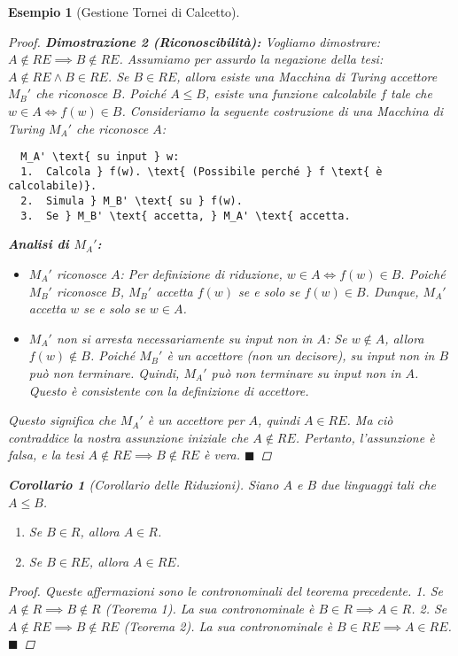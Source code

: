 \documentclass[a4paper]{article}
\newtheorem{example}[theorem]{Esempio}
\newtheorem{corollary}[theorem]{Corollario} %
\begin{document}
\begin{example}[Gestione Tornei di Calcetto]
\begin{proof}
\textbf{Dimostrazione 2 (Riconoscibilità):}
Vogliamo dimostrare: $A \notin RE \implies B \notin RE$.
Assumiamo per assurdo la negazione della tesi: $A \notin RE \land B \in RE$.
Se $B \in RE$, allora esiste una Macchina di Turing accettore $M_B'$ che riconosce $B$.
Poiché $A \le B$, esiste una funzione calcolabile $f$ tale che $w \in A \iff f(w) \in B$.
Consideriamo la seguente costruzione di una Macchina di Turing $M_A'$ che riconosce $A$:

\begin{verbatim}
  M_A' \text{ su input } w:
  1.  Calcola } f(w). \text{ (Possibile perché } f \text{ è calcolabile)}.
  2.  Simula } M_B' \text{ su } f(w).
  3.  Se } M_B' \text{ accetta, } M_A' \text{ accetta.
\end{verbatim}

\textbf{Analisi di $M_A'$:}
\begin{itemize}
    \item $M_A'$ riconosce $A$: Per definizione di riduzione, $w \in A \iff f(w) \in B$. Poiché $M_B'$ riconosce $B$, $M_B'$ accetta $f(w)$ se e solo se $f(w) \in B$. Dunque, $M_A'$ accetta $w$ se e solo se $w \in A$.
    \item $M_A'$ non si arresta necessariamente su input non in $A$: Se $w \notin A$, allora $f(w) \notin B$. Poiché $M_B'$ è un accettore (non un decisore), su input non in $B$ può non terminare. Quindi, $M_A'$ può non terminare su input non in $A$. Questo è consistente con la definizione di accettore.
\end{itemize}
Questo significa che $M_A'$ è un accettore per $A$, quindi $A \in RE$.
Ma ciò contraddice la nostra assunzione iniziale che $A \notin RE$.
Pertanto, l'assunzione è falsa, e la tesi $A \notin RE \implies B \notin RE$ è vera.
$\blacksquare$
\end{proof}

\begin{corollary}[Corollario delle Riduzioni]
Siano $A$ e $B$ due linguaggi tali che $A \le B$.
\begin{enumerate}
    \item Se $B \in R$, allora $A \in R$.
    \item Se $B \in RE$, allora $A \in RE$.
\end{enumerate}
\end{corollary}
\begin{proof}
Queste affermazioni sono le contronominali del teorema precedente.
1. Se $A \notin R \implies B \notin R$ (Teorema 1). La sua contronominale è $B \in R \implies A \in R$.
2. Se $A \notin RE \implies B \notin RE$ (Teorema 2). La sua contronominale è $B \in RE \implies A \in RE$.
$\blacksquare$
\end{proof}


\end{example}
\end{document}
